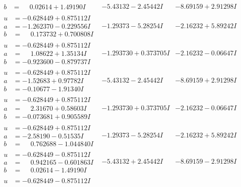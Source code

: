 \documentclass[1p]{elsarticle_modified}
\theoremstyle{definition}
\begin{document}
$$\begin{array}{c|c|c}
\begin{aligned}
b &= \phantom{-}0.02614 + 1.49190 I\end{aligned}
 & -5.43132 - 2.45442 I & -8.69159 + 2.91298 I \\ \hline\begin{aligned}
u &= -0.628449 + 0.875112 I \\
a &= -1.262370 - 0.229556 I \\
b &= \phantom{-}0.173732 + 0.700808 I\end{aligned}
 & -1.29373 - 5.28254 I & -2.16232 + 5.89242 I \\ \hline\begin{aligned}
u &= -0.628449 + 0.875112 I \\
a &= \phantom{-}1.08622 + 1.35134 I \\
b &= -0.923600 - 0.879737 I\end{aligned}
 & -1.293730 + 0.373705 I & -2.16232 - 0.06647 I \\ \hline\begin{aligned}
u &= -0.628449 + 0.875112 I \\
a &= -1.52683 + 0.97782 I \\
b &= -0.10677 - 1.91340 I\end{aligned}
 & -5.43132 - 2.45442 I & -8.69159 + 2.91298 I \\ \hline\begin{aligned}
u &= -0.628449 + 0.875112 I \\
a &= \phantom{-}2.31670 + 0.58603 I \\
b &= -0.073681 + 0.905589 I\end{aligned}
 & -1.293730 + 0.373705 I & -2.16232 - 0.06647 I \\ \hline\begin{aligned}
u &= -0.628449 + 0.875112 I \\
a &= -2.58190 - 0.51535 I \\
b &= \phantom{-}0.762688 - 1.044840 I\end{aligned}
 & -1.29373 - 5.28254 I & -2.16232 + 5.89242 I \\ \hline\begin{aligned}
u &= -0.628449 - 0.875112 I \\
a &= \phantom{-}0.942165 - 0.601863 I \\
b &= \phantom{-}0.02614 - 1.49190 I\end{aligned}
 & -5.43132 + 2.45442 I & -8.69159 - 2.91298 I \\ \hline\begin{aligned}
u &= -0.628449 - 0.875112 I \\

\end{aligned}
\end{array}$$
\end{document}
